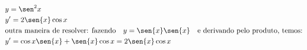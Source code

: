\begin{ex}
\begin{align}
&y=\sen^2{x}\nonumber\\
&y'=2\sen{x}\cos{x}\nonumber\\
&\text{outra maneira de resolver: fazendo}\quad y=\sen{x}\sen{x}\quad\text{e derivando pelo produto, temos:}\nonumber\\
&y'=\cos{x}\sen{x}+\sen{x}\cos{x}=2\sen{x}\cos{x}\nonumber
\end{align}
\end{ex}
